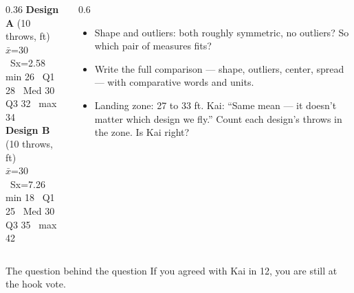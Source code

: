 \documentclass[aspectratio=169, 11pt]{beamer}
\begin{document}
\begin{frame}[t, plain]
  \begin{columns}[t]
    \begin{column}{0.36\textwidth}
      {\small\ttfamily
      \textbf{Design A} (10 throws, ft)\\
      $\bar{x}$=30 \ Sx=2.58\\
      min 26 \ Q1 28 \ Med 30\\
      Q3 32 \ max 34\\[6pt]
      \textbf{Design B} (10 throws, ft)\\
      $\bar{x}$=30 \ Sx=7.26\\
      min 18 \ Q1 25 \ Med 30\\
      Q3 35 \ max 42}
    \end{column}
    \begin{column}{0.6\textwidth}
      \begin{itemize}\setlength{\itemsep}{4pt}
        \item[10.] Shape and outliers: both roughly symmetric, no outliers? So which pair of
              measures fits?
        \item[11.] Write the full comparison --- shape, outliers, center, spread --- with
              comparative words and units.
        \item[12.] Landing zone: 27 to 33 ft. Kai: ``Same mean --- it doesn't matter which
              design we fly.'' Count each design's throws in the zone. Is Kai right?
      \end{itemize}
    \end{column}
  \end{columns}
  \begin{block}{The question behind the question}
    If you agreed with Kai in 12, you are still at the hook vote.
  \end{block}
\end{frame}
\end{document}
